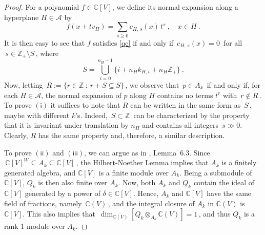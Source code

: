 \documentclass{amsart}
\theoremstyle{definition}
\theoremstyle{remark}
\numberwithin{equation}{section}
\begin{document}
\begin{proof}
For a polynomial $ f \in {\mathbb{C}}[V] $, we define its normal expansion
along a hyperplane $ H \in {\mathcal{A}} $ by
$$
f(x + t v_H) = \sum_{s \ge 0} c_{H,\,s}(x)\,t^s \ ,\quad x \in H\ .
$$
It is then easy to see that $ f $ satisfies \eqref{qc} if and only
if $\, c_{H,\,s}(x) = 0 \,$ for all $\, s \in{\mathbb{Z}}_+\!\setminus S
\,$, where
$$
S = \bigcup_{i=0}^{n_H-1}\{i+n_H k_{H,i}+n_H{\mathbb{Z}}_{+}\}\ .
$$
Now, letting $\,R := \{r \in {\mathbb{Z}} \ :\ r + S \subseteq S\}\,$, we
observe that $\, p \in A_k \,$ if and only if, for each $ H \in {\mathcal{A}}
$, the normal expansion of $ p $ along $ H $ contains no terms $ t^r
$ with $\, r \not\in R \,$. To prove $ \mathsf{(i)} $ it suffices to
note that $ R $ can be written in the same form as $\, S \,$, maybe
with different $ k$'s. Indeed, $\,S\subset {\mathbb{Z}}\,$ can be
characterized by the property that it is invariant under translation
by $n_H$ and contains all integers $\,s\gg 0$. Clearly, $R$ has
the same property and, therefore, a similar description.

To prove $ \mathsf{(ii)} $ and $ \mathsf{(iii)} $, we can argue
as in \cite{BEG}, Lemma~6.3. Since $\,{\mathbb{C}}[V]^W \subseteq A_k \subseteq
{\mathbb{C}}[V]\,$, the Hilbert-Noether Lemma implies that $ A_k $ is a
finitely generated algebra, and ${\mathbb{C}}[V] $ is a finite module over $
A_k $. Being a submodule of ${\mathbb{C}}[V] $, $ Q_k $ is then also
finite over $ A_k $. Now, both $ A_k $ and $ Q_k $ contain the
ideal of $ {\mathbb{C}}[V] $ generated by a power of $
\delta \in {\mathbb{C}}[V] $. Hence, $ A_k $ and $ {\mathbb{C}}[V] $ have the same
field of fractions, namely $\,{\mathbb{C}}(V)\,$, and the integral closure
of $ A_k $ in $ {\mathbb{C}}(V) $ is $ {\mathbb{C}}[V] $. This also implies that
$\,\dim_{{\mathbb{C}}(V)}[Q_k \otimes_{A_k} {\mathbb{C}}(V)] = 1 \,$, and thus $ Q_k $
is a rank $1$ module over $ A_k$.
\end{proof}
\end{document}

